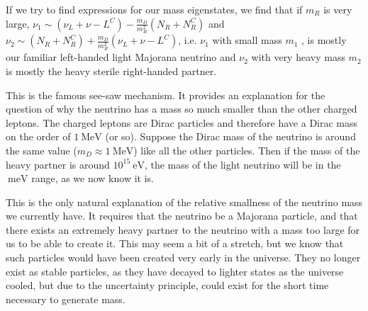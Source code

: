 If we try to find expressions for our mass eigenstates, we find that if $m_R$ is very large, \(\nu _1 \sim (\nu _L + \nu -L^C) - \frac{m_D}{m_R ^2}(N_R + N_R^C)\) and \(\nu _2 \sim (N_R + N_R^C)  + \frac{m_D}{m_R ^2}(\nu _L + \nu -L^C)\), i.e.  $\nu _1$ with small mass $m_1$ , is mostly our familiar left-handed light Majorana neutrino and \(\nu _2\) with very heavy mass $m_2$ is mostly the heavy sterile right-handed partner.

This is the famous see-saw mechanism. It provides an explanation for the question of why the neutrino has a mass so much smaller than the other charged leptons. The charged leptons are Dirac particles and therefore have a Dirac mass on the order of $1~\mathrm{MeV}$ (or so). Suppose the Dirac mass of the neutrino is around the same value ($m_D\approx 1~\mathrm{MeV}$) like all the other particles. Then if the mass of the heavy partner is around $10^{15}~\mathrm{eV}$, the mass of the light neutrino will be in the $~\mathrm{meV}$ range, as we now know it is.\cite{boyd}

This is the only natural explanation of the relative smallness of the neutrino mass we currently have. It requires that the neutrino be a Majorana particle, and that there exists an extremely heavy partner to the neutrino with a mass too large for us to be able to create it. This may seem a bit of a stretch, but we know that such particles would have been created very early in the universe. They no longer exist as stable particles, as they have decayed to lighter states as the universe cooled, but due to the uncertainty principle, could exist for the short time necessary to generate mass.


